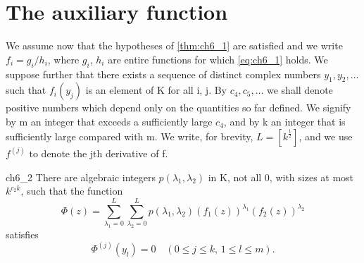 \section{The auxiliary function}

We assume now that the hypotheses of \autoref{thm:ch6_1} are satisfied and we write $f_i = g_i/h_i$, where $g_i$, $h_i$ are entire functions for which \eqref{eq:ch6_1} holds. We suppose further that there exists a sequence of distinct complex numbers $y_1, y_2, \dots$ such that $f_i(y_j)$ is an element of K for all i, j. By $c_4, c_5, \dots$ we shall denote positive numbers which depend only on the quantities so far defined. We signify by m an integer that exceeds a sufficiently large $c_4$, and by k an integer that is sufficiently large compared with m. We write, for brevity, $L = [k^{\frac{1}{2}}]$, and we use $f^{(j)}$ to denote the jth derivative of f.

\begin{mylemma}{}{ch6_2}
There are algebraic integers $p(\lambda_1, \lambda_2)$ in K, not all 0, with sizes at most $k^{c_2k}$, such that the function
\[\Phi(z) = \sum\limits_{\lambda_1=0}^L \sum\limits_{\lambda_2=0}^L p(\lambda_1,\lambda_2) \left(f_1(z)\right)^{\lambda_1} (f_2(z))^{\lambda_2}\]
satisfies
\[\Phi^{(j)}(y_l)=0 \quad (0\leqslant j\leqslant k,\, 1\leqslant l\leqslant m).\]
\end{mylemma}


